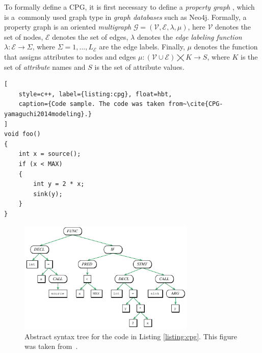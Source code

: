To formally define a CPG, it is first necessary to define a \textit{property graph} \cite{CPG-yamaguchi2014modeling}, which is a~commonly used graph type in \textit{graph databases} such as Neo4j. Formally, a property graph is an oriented \textit{multigraph}  $\mathcal{G} = (\mathcal{V}, \mathcal{E}, \lambda, \mu)$, here $\mathcal{V}$ denotes the set of nodes, $\mathcal{E}$ denotes the set of edges, $\lambda$ denotes the \textit{edge labeling function} $\lambda : \mathcal{E} \rightarrow \Sigma$, where $\Sigma = {1, ..., L_\mathcal{E}}$ are the edge labels. Finally, $\mu$ denotes the function that assigns attributes to nodes and edges $\mu: (\mathcal{V} \cup \mathcal{E}) \bigtimes K \rightarrow S$, where $K$ is the set of \textit{attribute} names and $S$ is the set of attribute values.

\begin{lstlisting}[
    style=c++, label={listing:cpg}, float=hbt,
    caption={Code sample. The code was taken from~\cite{CPG-yamaguchi2014modeling}.}
]
void foo()
{
    int x = source();
    if (x < MAX)
    {
        int y = 2 * x;
        sink(y);
    }
}
\end{lstlisting}

\begin{figure}[hbt]
	\centering
	\includegraphics[width=0.75\textwidth]{figures/AST.pdf}
	\caption{Abstract syntax tree for the code in Listing \ref{listing:cpg}. This figure was taken from~\cite{CPG-yamaguchi2014modeling}.}
	\label{figure:AST}
\end{figure}


